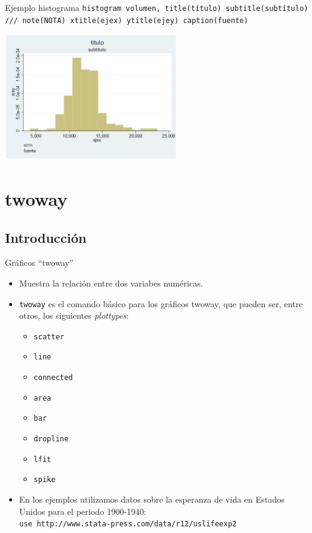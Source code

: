 \documentclass{beamer}
\begin{document}
\begin{frame}{Ejemplo histograma}{}
{\footnotesize \texttt{histogram volumen, title(título) subtitle(subtítulo) /// note(NOTA) xtitle(ejex) ytitle(ejey) caption(fuente)}}\\\medskip
\centerline{\includegraphics[height=5.5cm]{hist.jpg}}
\end{frame}

\section{twoway}
\subsection{Introducción}
\begin{frame}{Gráficos ``twoway''}
\begin{itemize}
\item Muestra la relación entre dos variabes numéricas.
\item \texttt{twoway} es el comando básico para los gráficos twoway, que pueden ser, entre otros, los siguientes \textit{plottypes}:
\begin{itemize}
\item \texttt{scatter} 
\item \texttt{line} 
\item \texttt{connected}  
\item \texttt{area} 
\item \texttt{bar} 
\item \texttt{dropline} 
\item \texttt{lfit} 
\item \texttt{spike} 
\end{itemize}
\item En los ejemplos utilizamos datos sobre la esperanza de vida en Estados Unidos para el periodo 1900-1940:\\
{\footnotesize \texttt{use http://www.stata-press.com/data/r12/uslifeexp2}}
\end{itemize}
\end{frame}
\end{document}
